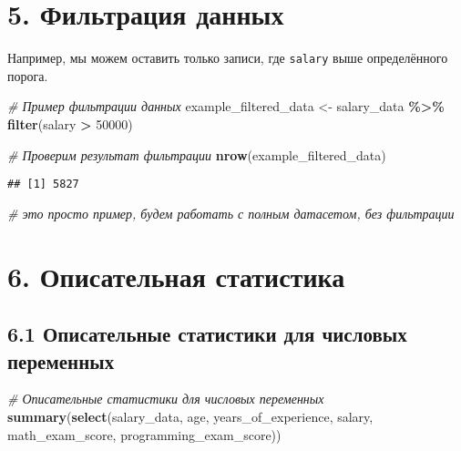 \documentclass[
]{article}
\newenvironment{Shaded}{\begin{snugshade}}{\end{snugshade}}
\newcommand{\CommentTok}[1]{\textcolor[rgb]{0.56,0.35,0.01}{\textit{#1}}}
\newcommand{\DecValTok}[1]{\textcolor[rgb]{0.00,0.00,0.81}{#1}}
\newcommand{\FunctionTok}[1]{\textcolor[rgb]{0.13,0.29,0.53}{\textbf{#1}}}
\newcommand{\NormalTok}[1]{#1}
\newcommand{\OtherTok}[1]{\textcolor[rgb]{0.56,0.35,0.01}{#1}}
\newcommand{\SpecialCharTok}[1]{\textcolor[rgb]{0.81,0.36,0.00}{\textbf{#1}}}
\begin{document}
\section{5. Фильтрация
данных}\label{ux444ux438ux43bux44cux442ux440ux430ux446ux438ux44f-ux434ux430ux43dux43dux44bux445}

Например, мы можем оставить только записи, где \texttt{salary} выше
определённого порога.

\begin{Shaded}
\begin{Highlighting}[]
\CommentTok{\# Пример фильтрации данных}
\NormalTok{example\_filtered\_data }\OtherTok{\textless{}{-}}\NormalTok{ salary\_data }\SpecialCharTok{\%\textgreater{}\%} \FunctionTok{filter}\NormalTok{(salary }\SpecialCharTok{\textgreater{}} \DecValTok{50000}\NormalTok{)}

\CommentTok{\# Проверим результат фильтрации}
\FunctionTok{nrow}\NormalTok{(example\_filtered\_data)}
\end{Highlighting}
\end{Shaded}

\begin{verbatim}
## [1] 5827
\end{verbatim}

\begin{Shaded}
\begin{Highlighting}[]
\CommentTok{\# это просто пример, будем работать с полным датасетом, без фильтрации}
\end{Highlighting}
\end{Shaded}

\section{6. Описательная
статистика}\label{ux43eux43fux438ux441ux430ux442ux435ux43bux44cux43dux430ux44f-ux441ux442ux430ux442ux438ux441ux442ux438ux43aux430}

\subsection{6.1 Описательные статистики для числовых
переменных}\label{ux43eux43fux438ux441ux430ux442ux435ux43bux44cux43dux44bux435-ux441ux442ux430ux442ux438ux441ux442ux438ux43aux438-ux434ux43bux44f-ux447ux438ux441ux43bux43eux432ux44bux445-ux43fux435ux440ux435ux43cux435ux43dux43dux44bux445}

\begin{Shaded}
\begin{Highlighting}[]
\CommentTok{\# Описательные статистики для числовых переменных}
\FunctionTok{summary}\NormalTok{(}\FunctionTok{select}\NormalTok{(salary\_data, age, years\_of\_experience, salary, math\_exam\_score, programming\_exam\_score))}
\end{Highlighting}
\end{Shaded}
\end{document}
